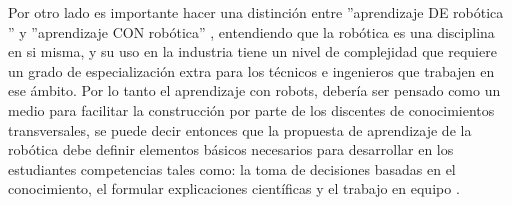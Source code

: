 Por otro lado es importante hacer una distinción entre ''aprendizaje DE robótica '' y ''aprendizaje CON robótica'' \citep{malec2001some}, entendiendo que la robótica es una disciplina en si misma, y su uso en la industria tiene un nivel de complejidad que requiere un grado de especialización extra para los técnicos e ingenieros que trabajen en ese ámbito. Por lo tanto el aprendizaje con robots, debería ser pensado como un medio para facilitar la construcción por parte de los discentes de conocimientos transversales, se puede decir entonces que la propuesta de aprendizaje de la robótica debe definir elementos básicos necesarios
para desarrollar en los estudiantes competencias tales como: la toma de decisiones basadas en
el conocimiento, el formular explicaciones científicas y el trabajo en equipo \citep{lopez2013aprendizaje}.


